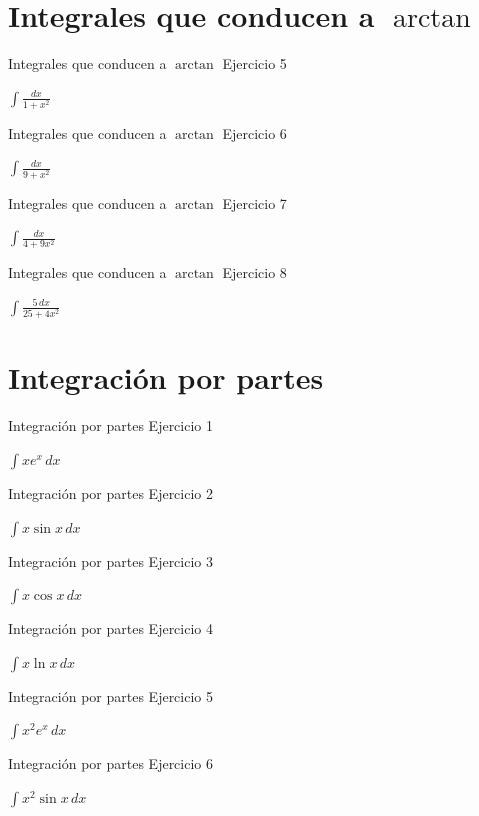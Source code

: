 \documentclass[10pt,aspectratio=169]{beamer}
\newcommand{\ejercicio}[1]{%
  \begin{center}
  \vfill
  {\fontsize{24}{30}\selectfont #1}
  \vfill
  \end{center}
}
\begin{document}
\section{Integrales que conducen a $\arctan$}
\begin{frame}{Integrales que conducen a $\arctan$}
\small Ejercicio 5
\ejercicio{$\displaystyle \int \frac{dx}{1+x^2}$}
\end{frame}
\begin{frame}{Integrales que conducen a $\arctan$}
\small Ejercicio 6
\ejercicio{$\displaystyle \int \frac{dx}{9+x^2}$}
\end{frame}
\begin{frame}{Integrales que conducen a $\arctan$}
\small Ejercicio 7
\ejercicio{$\displaystyle \int \frac{dx}{4+9x^2}$}
\end{frame}
\begin{frame}{Integrales que conducen a $\arctan$}
\small Ejercicio 8
\ejercicio{$\displaystyle \int \frac{5\,dx}{25+4x^2}$}
\end{frame}

\section{Integración por partes}

\begin{frame}{Integración por partes}
\small Ejercicio 1
\ejercicio{$\displaystyle \int x e^x\,dx$}
\end{frame}

\begin{frame}{Integración por partes}
\small Ejercicio 2
\ejercicio{$\displaystyle \int x\sin x\,dx$}
\end{frame}

\begin{frame}{Integración por partes}
\small Ejercicio 3
\ejercicio{$\displaystyle \int x\cos x\,dx$}
\end{frame}

\begin{frame}{Integración por partes}
\small Ejercicio 4
\ejercicio{$\displaystyle \int x\ln x\,dx$}
\end{frame}

\begin{frame}{Integración por partes}
\small Ejercicio 5
\ejercicio{$\displaystyle \int x^2e^x\,dx$}
\end{frame}

\begin{frame}{Integración por partes}
\small Ejercicio 6
\ejercicio{$\displaystyle \int x^2\sin x\,dx$}
\end{frame}
\end{document}
